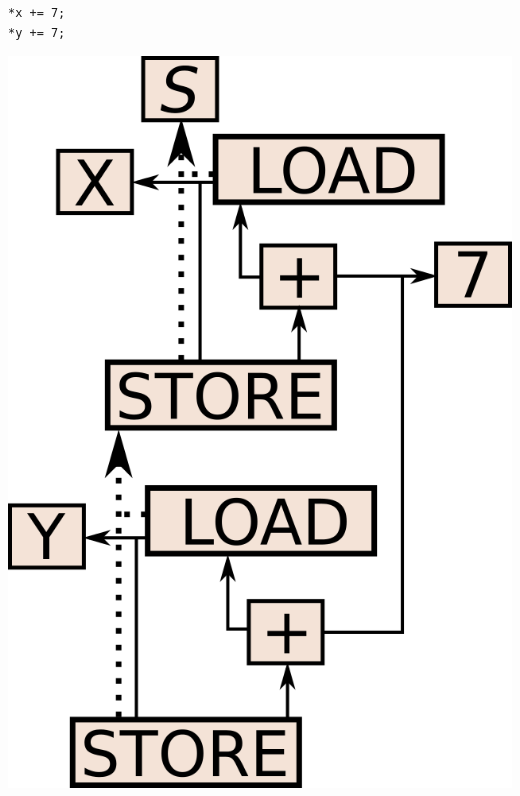 \begin{centering}
	\noindent\begin{minipage}{0.36\textwidth}
		\begin{CenteredBox}
		\begin{lstlisting}[label={lst:load_dependence_ex},
style=minipage_customcpp, basicstyle=\fontsize{10}{1}]
*x += 7;
*y += 7;
		\end{lstlisting}
		\end{CenteredBox}
	\end{minipage}
	\noindent\begin{minipage}{0.55\textwidth}
		\captionsetup{type=figure}
		\includegraphics[width=\textwidth]{figures/svg/load_store_state_dependence_ex}
	\end{minipage}
	\label{fig:load_dependence_ex}
\end{centering}


